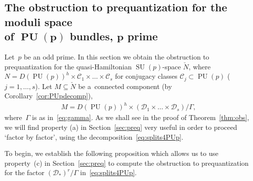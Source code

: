 \documentclass[11pt]{article}
\numberwithin{equation}{section}
\DeclareMathOperator{\SU}{SU}
\DeclareMathOperator{\PU}{PU}
\begin{document}
\subsection[The obstruction to prequantization for the moduli space of $\PU(p)$ bundles, $p$ prime]{The obstruction
to prequantization for the moduli space\\ of $\boldsymbol{\PU(p)}$ bundles, $\boldsymbol{p}$ prime}

Let~$p$ be an odd prime.
In this section we obtain the obstruction to prequantization for the quasi-Hamiltonian $\SU(p)$-space $\check{N}$, where
$N= D(\PU(p))^h \times \mathcal{C}_1 \times \dots \times \mathcal{C}_s $ for conjugacy classes $\mathcal{C}_j \subset
\PU(p)$ ($j=1,\ldots,s$).
Let $M\subseteq \check{N}$ be a~connected component (by Corollary~\ref{cor:PUpdecomp}),
\begin{gather*}
M=D(\PU(p))^h \times \left(\mathcal{D}_1 \times \dots \times \mathcal{D}_s\right)/{\Gamma},
\end{gather*}
where~$\Gamma$ is as in~\eqref{eq:gamma}.
As we shall see in the proof of Theorem~\ref{thm:obs}, we will f\/ind property (a) in Section~\ref{sec:preq} very useful
in order to proceed `factor by factor',
using the decomposition~\eqref{eq:splits4PUp}.

To begin, we establish the following proposition which allows us to use property~(c) in Section~\ref{sec:preq} to
compute the obstruction to prequantization for the factor $(\mathcal{D}_*)^r/\Gamma$ in~\eqref{eq:splits4PUp}.
\end{document}
